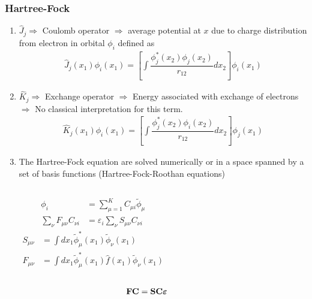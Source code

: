 \documentclass[slidestop,mathserif,compress,xcolor=svgnames]{beamer}
\begin{document}
\begin{frame}
  \frametitle{\small Hartree-Fock}
  \begin{enumerate}
    \item $\hat{J}_j\Rightarrow$ Coulomb operator $\Rightarrow$ average potential at $x$ due to charge distribution from electron in orbital $\phi_i$ defined as
    \begin{align*}
      \hat{J}_j(x_1)\phi_i(x_1) = \left[\int\dfrac{\phi^\ast_j(x_2)\phi_j(x_2)}{r_{12}}dx_2\right]\phi_i(x_1)
    \end{align*}
    \item $\hat{K}_j\Rightarrow$ Exchange operator $\Rightarrow$ Energy associated with exchange of electrons $\Rightarrow$ No classical interpretation for this term.
    \begin{align*}
      \hat{K}_j(x_1)\phi_i(x_1) = \left[\int\dfrac{\phi^\ast_j(x_2)\phi_i(x_2)}{r_{12}}dx_2\right]\phi_j(x_1)
    \end{align*}
    \item The Hartree-Fock equation are solved numerically or in a space spanned by a set of basis functions (Hartree-Fock-Roothan equations)
    \begin{columns}
      \column{4cm}
      \vspace{-0.5cm}
      \begin{align*}
	\phi_i &= \sum^K_{\mu=1}C_{\mu i}\tilde{\phi}_\mu\\
	\sum_\nu F_{\mu\nu}C_{\nu i} &= \varepsilon_i\sum_\nu S_{\mu\nu}C_{\nu i}
      \end{align*}
      \column{4cm}
      \vspace{-0.35cm}
      \begin{align*}
	S_{\mu\nu} &= \int dx_1\tilde{\phi}^\ast_\mu(x_1)\tilde{\phi}_\nu(x_1)\\
	F_{\mu\nu} &= \int dx_1\tilde{\phi}^\ast_\mu(x_1)\hat{f}(x_1)\tilde{\phi}_\nu(x_1)
      \end{align*}
    \end{columns}
    \begin{align*}
      \hspace{-1cm}{\bf FC}&={\bf SC}{\boldsymbol\varepsilon}
    \end{align*}
  \end{enumerate}
\end{frame}
\end{document}
